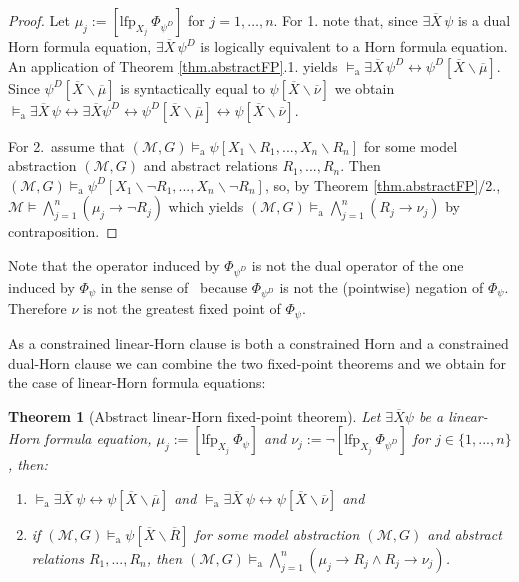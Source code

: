\documentclass[acmsmall]{acmart}
\theoremstyle{plain}
\newtheorem{theorem}{Theorem}
\theoremstyle{definition}
\newcommand{\calM}{\mathcal{M}}
\newcommand{\mybar}[1]{\overline{#1}}
\newcommand{\sop}{[} %
\newcommand{\scl}{]} %
\newcommand{\sel}[2]{#1 \backslash #2} %
\newcommand{\unsubst}[2]{\sop \sel{#1}{#2} \scl} %
\newcommand{\impl}{\rightarrow} %
\newcommand{\liff}{\leftrightarrow} %
\newcommand{\Land}{\bigwedge}
\newcommand{\lfp}{\mathrm{lfp}} %
\newcommand{\modelsa}{\models_\mathrm{a}} %
\begin{document}
\begin{proof}
Let $\mu_j := [\lfp_{X_j} ~\Phi_{\psi^D}]$ for $j = 1,\ldots,n$.
For 1. note that, since $\exists \mybar{X}\, \psi$ is a dual Horn formula
 equation, $\exists \mybar{X}\, \psi^D$ is logically equivalent to a Horn formula equation. %
An application of Theorem \ref{thm.abstractFP}.1. yields
 $\modelsa \exists \mybar{X}\, \psi^D \liff \psi^D \unsubst{\mybar{X}}{\mybar{\mu}}$.
Since $\psi^D\unsubst{\mybar{X}}{\mybar{\mu}}$ is syntactically equal to $\psi\unsubst{\mybar{X}}{\mybar{\nu}}$
 we obtain $\modelsa \exists \mybar{X}\, \psi \liff \exists \mybar{X}\psi^D \liff \psi^D\unsubst{\mybar{X}}{\mybar{\mu}} \liff \psi\unsubst{\mybar{X}}{\mybar{\nu}}$.
 
For 2.\ assume that $(\calM,G) \modelsa \psi[X_1\backslash R_1,...,X_n\backslash R_n]$ for some model abstraction $(\calM,G)$ and abstract relations $R_1,...,R_n$.
Then  $(\calM,G) \modelsa \psi^D[X_1\backslash \neg R_1,...,X_n\backslash\neg R_n]$, so, by Theorem \ref{thm.abstractFP}/2., $\calM \models \Land_{j=1}^n ( \mu_j \impl \neg R_j)$
 which yields $(\calM,G) \modelsa \Land_{j=1}^n ( R_j \rightarrow \nu_j )$ by contraposition.
\end{proof}
%

Note that the operator induced by $\Phi_{\psi^D}$ is not the dual operator of the one induced by $\Phi_\psi$
 in the sense of~\cite{Fritz01Fixed} because $\Phi_{\psi^D}$ is not the (pointwise) negation of
 $\Phi_\psi$.
Therefore $\nu$ is not the greatest fixed point of $\Phi_\psi$.

 
 
As a constrained linear-Horn clause is both a constrained Horn and a constrained dual-Horn clause we can combine the two fixed-point theorems and we obtain for the case of linear-Horn formula equations:
%
\begin{theorem}[Abstract linear-Horn fixed-point theorem]\label{thm.abstractLinearFP}
	Let $\exists \mybar{X} \psi$ be a linear-Horn formula equation, $\mu_j := [\lfp_{X_j} ~\Phi_\psi]$ and $\nu_j := \neg [\lfp_{X_j} ~\Phi_{\psi^D}]$ for $j \in \{1,...,n\}$, then:
	\begin{enumerate}
		\item $\modelsa \exists \mybar{X}  ~\psi \leftrightarrow \psi[\mybar{X}\backslash \mybar{\mu}]$ and $\modelsa \exists \mybar{X}  ~\psi \leftrightarrow \psi[\mybar{X}\backslash \mybar{\nu}]$ and
		\item if $(\calM,G) \modelsa \psi[\mybar{X}\backslash \mybar{R}]$ for some model abstraction $(\calM,G)$ and abstract relations $R_1,...,R_n$, then $(\calM,G) \modelsa \bigwedge_{j=1}^n (\mu_j \rightarrow R_j \land R_j \rightarrow \nu_j)$.
	\end{enumerate}
\end{theorem}
\end{document}
